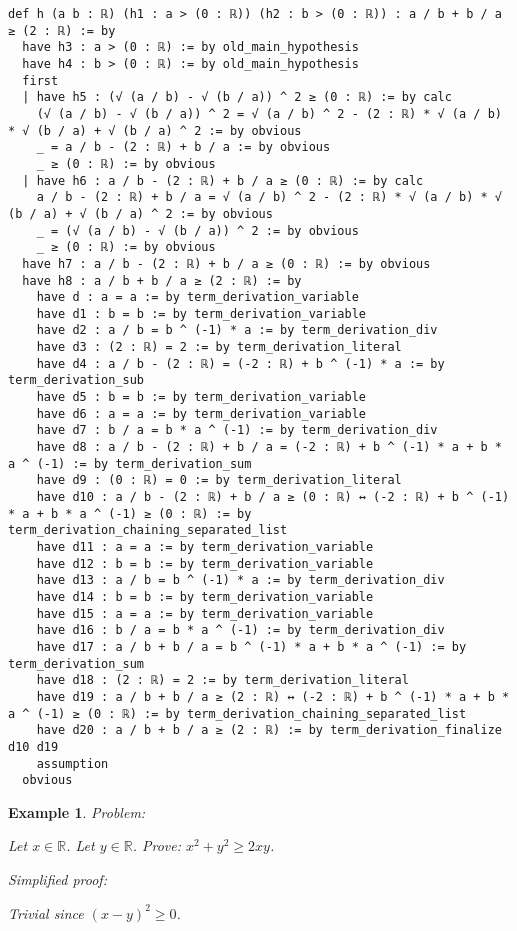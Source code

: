 \documentclass{article}
\newtheorem{example}{Example}
\begin{document}
\begin{tcolorbox}[colback=white!10, width=\linewidth]
\begin{lstlisting}[language=Lean4]
def h (a b : ℝ) (h1 : a > (0 : ℝ)) (h2 : b > (0 : ℝ)) : a / b + b / a ≥ (2 : ℝ) := by
  have h3 : a > (0 : ℝ) := by old_main_hypothesis
  have h4 : b > (0 : ℝ) := by old_main_hypothesis
  first
  | have h5 : (√ (a / b) - √ (b / a)) ^ 2 ≥ (0 : ℝ) := by calc
    (√ (a / b) - √ (b / a)) ^ 2 = √ (a / b) ^ 2 - (2 : ℝ) * √ (a / b) * √ (b / a) + √ (b / a) ^ 2 := by obvious
    _ = a / b - (2 : ℝ) + b / a := by obvious
    _ ≥ (0 : ℝ) := by obvious
  | have h6 : a / b - (2 : ℝ) + b / a ≥ (0 : ℝ) := by calc
    a / b - (2 : ℝ) + b / a = √ (a / b) ^ 2 - (2 : ℝ) * √ (a / b) * √ (b / a) + √ (b / a) ^ 2 := by obvious
    _ = (√ (a / b) - √ (b / a)) ^ 2 := by obvious
    _ ≥ (0 : ℝ) := by obvious
  have h7 : a / b - (2 : ℝ) + b / a ≥ (0 : ℝ) := by obvious
  have h8 : a / b + b / a ≥ (2 : ℝ) := by
    have d : a = a := by term_derivation_variable
    have d1 : b = b := by term_derivation_variable
    have d2 : a / b = b ^ (-1) * a := by term_derivation_div
    have d3 : (2 : ℝ) = 2 := by term_derivation_literal
    have d4 : a / b - (2 : ℝ) = (-2 : ℝ) + b ^ (-1) * a := by term_derivation_sub
    have d5 : b = b := by term_derivation_variable
    have d6 : a = a := by term_derivation_variable
    have d7 : b / a = b * a ^ (-1) := by term_derivation_div
    have d8 : a / b - (2 : ℝ) + b / a = (-2 : ℝ) + b ^ (-1) * a + b * a ^ (-1) := by term_derivation_sum
    have d9 : (0 : ℝ) = 0 := by term_derivation_literal
    have d10 : a / b - (2 : ℝ) + b / a ≥ (0 : ℝ) ↔ (-2 : ℝ) + b ^ (-1) * a + b * a ^ (-1) ≥ (0 : ℝ) := by term_derivation_chaining_separated_list
    have d11 : a = a := by term_derivation_variable
    have d12 : b = b := by term_derivation_variable
    have d13 : a / b = b ^ (-1) * a := by term_derivation_div
    have d14 : b = b := by term_derivation_variable
    have d15 : a = a := by term_derivation_variable
    have d16 : b / a = b * a ^ (-1) := by term_derivation_div
    have d17 : a / b + b / a = b ^ (-1) * a + b * a ^ (-1) := by term_derivation_sum
    have d18 : (2 : ℝ) = 2 := by term_derivation_literal
    have d19 : a / b + b / a ≥ (2 : ℝ) ↔ (-2 : ℝ) + b ^ (-1) * a + b * a ^ (-1) ≥ (0 : ℝ) := by term_derivation_chaining_separated_list
    have d20 : a / b + b / a ≥ (2 : ℝ) := by term_derivation_finalize d10 d19
    assumption
  obvious

\end{lstlisting}
\end{tcolorbox}


\begin{example}
Problem:
\begin{tcolorbox}[colback=yellow!10, width=\linewidth]
Let $x\in\mathbb{R}$. Let $y\in\mathbb{R}$.
    Prove: $x^2 + y^2 \ge 2xy$.
\end{tcolorbox}

Simplified proof:
\begin{tcolorbox}[colback=blue!10, width=\linewidth]
Trivial since $(x-y)^2 \ge 0$.
\end{tcolorbox}
\end{example}
\end{document}
